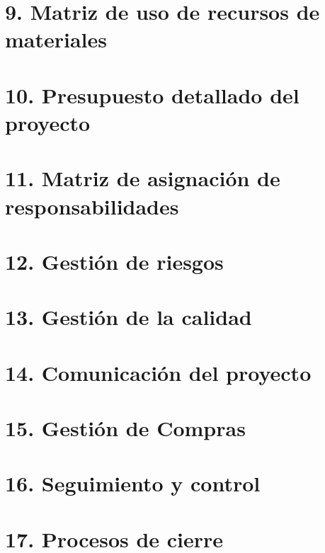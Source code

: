 \documentclass[12pt]{charter}
\begin{document}
\section{9. Matriz de uso de recursos de materiales}
\section{10. Presupuesto detallado del proyecto}
\section{11. Matriz de asignación de responsabilidades}
\section{12. Gestión de riesgos}
\section{13. Gestión de la calidad}
\section{14. Comunicación del proyecto}
\section{15. Gestión de Compras}
\section{16. Seguimiento y control}
\section{17. Procesos de cierre}    
\end{document}
